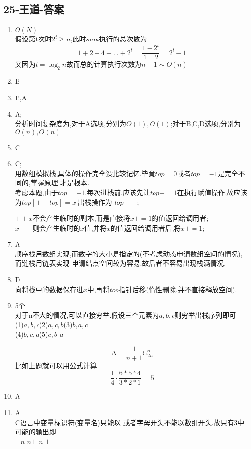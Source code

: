 \documentclass[12pt, a4paper, oneside, UTF8]{ctexbook}
\begin{document}
\subsection{25-王道-答案}
\begin{enumerate}
    \item $O(N)$ \\
    假设第t次时$2^t\geq n$,此时$sum$执行的总次数为 
    $$
    1 + 2 + 4 + \ldots + 2^t = \frac{1-2^t}{1-2}=2^t - 1
    $$
    又因为$t=\log_2{n}$故而总的计算执行次数为$n-1\sim O(n)$
    \item B 
    \item B,A 
    \item A;\\ 
    分析时间复杂度为,对于A选项,分别为$O(1),O(1)$;对于B,C,D选项,分别为$O(n),O(n)$
    \item C 
    \item C;  \\
    用数组模拟栈,具体的操作完全没比较记忆.毕竟$top=0$或者$top=-1$是完全不同的,掌握原理
    才是根本. \\
    考虑本题,由于$top=-1$,每次进栈前,应该先让$top+=1$在执行赋值操作,故应该为$top[++top]=x$;出栈操作为
    $top--$;
    \begin{remark}[区分$++x$和$x++$]
        $++x$不会产生临时的副本,而是直接将$x+=1$的值返回给调用者; \\
        $x++$则会产生临时的$x$值,并将$x$的值返回给调用者后,将$x+=1$;
    \end{remark}
    \item A \\
    顺序栈用数组实现,而数字的大小是指定的(不考虑动态申请数组空间的情况),而链栈用链表实现
    申请结点空间较为容易.故后者不容易出现栈满情况.

    \item D \\
    向将栈中的数据保存进$x$中,再将$top$指针后移(惰性删除,并不直接释放空间). 

    \item 5个 \\
    对于n不大的情况,可以直接穷举.假设三个元素为$a,b,c$则穷举出栈序列即可 \\
    (1)$a,b,c$\qquad (2)$a,c,b$\qquad (3)$b,a,c$\\
    (4)$b,c,a$\qquad (5)$c,b,a$ 
    \begin{remark}[求n个不同元素的出栈序列的个数]
        $$
        N=\frac{1}{n+1}C_{2n}^{n} 
        $$
        比如上题就可以用公式计算 
        $$
        \frac{1}{4}\cdot\frac{6*5*4}{3*2*1} = 5
        $$
    \end{remark}
    \item A 
    \item A \\
    C语言中变量标识符(变量名)只能以$\_$或者字母开头不能以数组开头.故只有3中可能的输出即\\
    $\_1n$ \qquad $n1\_$ \qquad $n\_ 1$ 


\end{enumerate}
\end{document}
